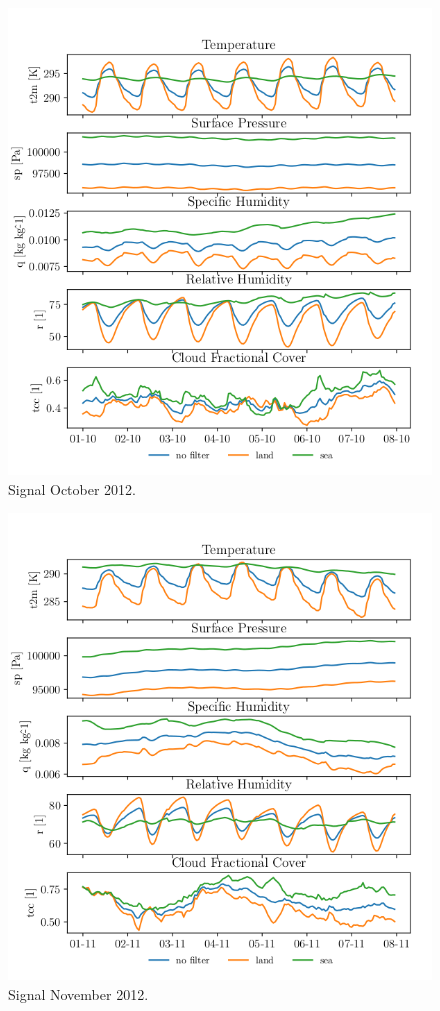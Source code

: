\begin{figure}[ht]
    \centering
    \includegraphics{python_figs/spatially_averaged_one_week_from_2012-10-01.png}
    \caption{Signal October 2012.}
    \label{fig:oct12}
\end{figure}


\begin{figure}[ht]
    \centering
    \includegraphics{python_figs/spatially_averaged_one_week_from_2012-11-01.png}
    \caption{Signal November 2012.}
    \label{fig:nov12}
\end{figure}

